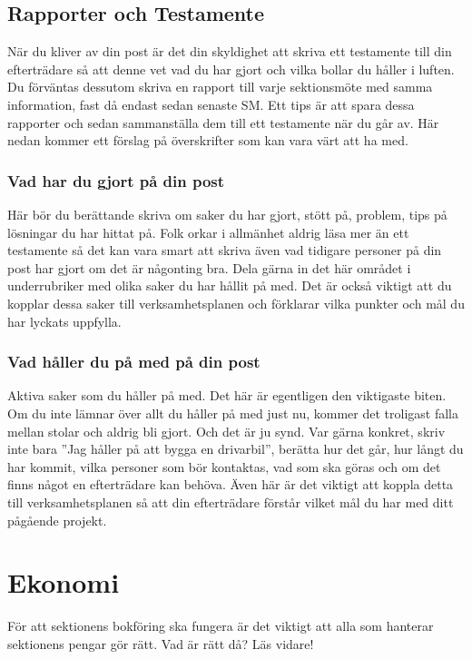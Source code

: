 \documentclass[a4paper,11pt]{article}
\begin{document}
\subsection{Rapporter och Testamente}
När du kliver av din post är det din skyldighet att skriva ett testamente till din efterträdare så att denne vet vad du har gjort och vilka bollar du håller i luften. Du förväntas dessutom skriva en rapport till varje sektionsmöte med samma information, fast då endast sedan senaste SM. Ett tips är att spara dessa rapporter och sedan sammanställa dem till ett testamente när du går av. Här nedan kommer ett förslag på överskrifter som kan vara värt att ha med.

\subsubsection{Vad har du gjort på din post}
Här bör du berättande skriva om saker du har gjort, stött på, problem, tips på lösningar du har hittat på. Folk orkar i allmänhet aldrig läsa mer än ett testamente så det kan vara smart att skriva även vad tidigare personer på din post har gjort om det är någonting bra. Dela gärna in det här området i underrubriker med olika saker du har hållit på med. Det är också viktigt att du kopplar dessa saker till verksamhetsplanen och förklarar vilka punkter och mål du har lyckats uppfylla.

\subsubsection{Vad håller du på med på din post}
Aktiva saker som du håller på med. Det här är egentligen den viktigaste biten. Om du inte lämnar över allt du håller på med just nu, kommer det troligast falla mellan stolar och aldrig bli gjort. Och det är ju synd. Var gärna konkret, skriv inte bara ''Jag håller på att bygga en drivarbil'', berätta hur det går, hur långt du har kommit, vilka personer som bör kontaktas, vad som ska göras och om det finns något en efterträdare kan behöva. Även här är det viktigt att koppla detta till verksamhetsplanen så att din efterträdare förstår vilket mål du har med ditt pågående projekt.

\section{Ekonomi}
För att sektionens bokföring ska fungera är det viktigt att alla som hanterar sektionens pengar gör rätt. Vad är rätt då? Läs vidare!
\end{document}
